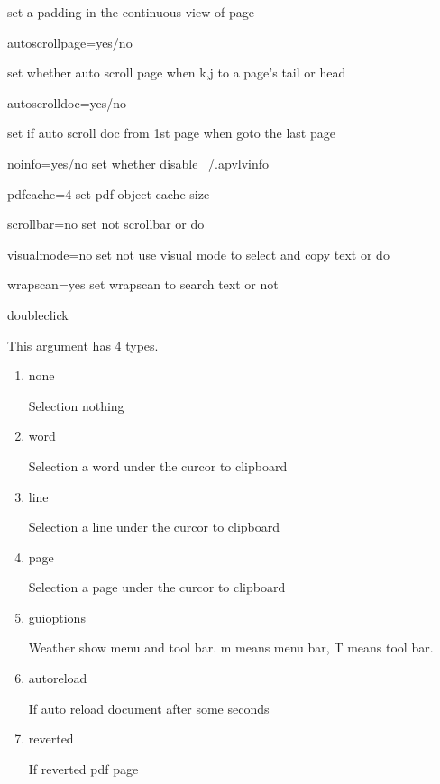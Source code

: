 \documentclass[a4paper,12pt]{article}
\begin{document}
\begin{description}
set a padding in the continuous view of page

\item autoscrollpage=yes/no

set whether auto scroll page when k,j to a page's tail or head

\item autoscrolldoc=yes/no

set if auto scroll doc from 1st page when goto the last page

\item noinfo=yes/no
set whether disable ~/.apvlvinfo

\item pdfcache=4
set pdf object cache size

\item scrollbar=no
set not scrollbar or do

\item visualmode=no
set not use visual mode to select and copy text or do

\item wrapscan=yes
set wrapscan to search text or not

\item doubleclick

This argument has 4 types.

\begin{enumerate}

\item none

Selection nothing

\item word

Selection a word under the curcor to clipboard

\item line

Selection a line under the curcor to clipboard

\item page

Selection a page under the curcor to clipboard

\item guioptions

Weather show menu and tool bar. m means menu bar, T means tool bar.

\item autoreload

If auto reload document after some seconds

\item reverted

If reverted pdf page

\end{enumerate}

\end{description}
\end{document}
